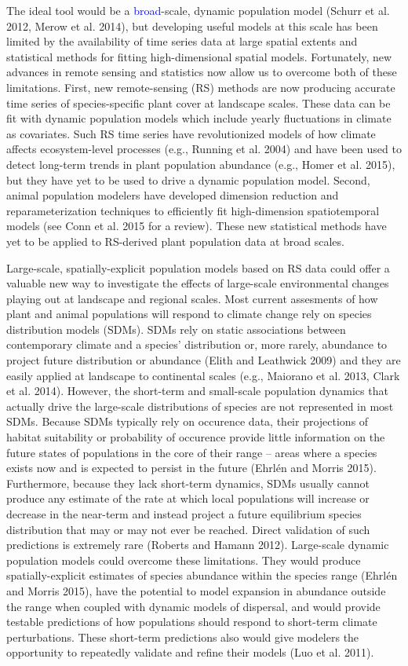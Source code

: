 \documentclass[12pt,]{article}
\begin{document}
The ideal tool would be a \textcolor{blue}{broad}-scale, dynamic
population model (Schurr et al. 2012, Merow et al. 2014), but developing
useful models at this scale has been limited by the availability of time
series data at large spatial extents and statistical methods for fitting
high-dimensional spatial models. Fortunately, new advances in remote
sensing and statistics now allow us to overcome both of these
limitations. First, new remote-sensing (RS) methods are now producing
accurate time series of species-specific plant cover at landscape
scales. These data can be fit with dynamic population models which
include yearly fluctuations in climate as covariates. Such RS time
series have revolutionized models of how climate affects ecosystem-level
processes (e.g., Running et al. 2004) and have been used to detect
long-term trends in plant population abundance (e.g., Homer et al.
2015), but they have yet to be used to drive a dynamic population model.
Second, animal population modelers have developed dimension reduction
and reparameterization techniques to efficiently fit high-dimension
spatiotemporal models (see Conn et al. 2015 for a review). These new
statistical methods have yet to be applied to RS-derived plant
population data at broad scales.

Large-scale, spatially-explicit population models based on RS data could
offer a valuable new way to investigate the effects of large-scale
environmental changes playing out at landscape and regional scales. Most
current assesments of how plant and animal populations will respond to
climate change rely on species distribution models (SDMs). SDMs rely on
static associations between contemporary climate and a species'
distribution or, more rarely, abundance to project future distribution
or abundance (Elith and Leathwick 2009) and they are easily applied at
landscape to continental scales (e.g., Maiorano et al. 2013, Clark et
al. 2014). However, the short-term and small-scale population dynamics
that actually drive the large-scale distributions of species are not
represented in most SDMs. Because SDMs typically rely on occurence data,
their projections of habitat suitability or probability of occurence
provide little information on the future states of populations in the
core of their range -- areas where a species exists now and is expected
to persist in the future (Ehrl{é}n and Morris 2015). Furthermore,
because they lack short-term dynamics, SDMs usually cannot produce any
estimate of the rate at which local populations will increase or
decrease in the near-term and instead project a future equilibrium
species distribution that may or may not ever be reached. Direct
validation of such predictions is extremely rare (Roberts and Hamann
2012). Large-scale dynamic population models could overcome these
limitations. They would produce spatially-explicit estimates of species
abundance within the species range (Ehrl{é}n and Morris 2015), have the
potential to model expansion in abundance outside the range when coupled
with dynamic models of dispersal, and would provide testable predictions
of how populations should respond to short-term climate perturbations.
These short-term predictions also would give modelers the opportunity to
repeatedly validate and refine their models (Luo et al. 2011).
\end{document}

